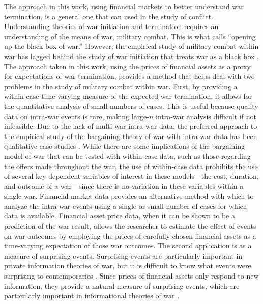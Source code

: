 The approach in this work, using financial markets to better understand war termination, is a general one that can used in the study of conflict.
Understanding theories of war initiation and termination requires an understanding of the means of war, military combat.
This is what \textcite{Gartner1998} calls ``opening up the black box of war.''
However, the empirical study of military combat within war has lagged behind the study of war initiation that treats war as a black box \parencite{Reiter2003}.
The approach taken in this work, using the prices of financial assets as a proxy for expectations of war termination, provides a method that helps deal with two problems in the study of military combat within war.
First, by providing a within-case time-varying measure of the expected war termination, it allows for the quantitative analysis of small numbers of cases.
This is useful because quality data on intra-war events is rare, making large-$n$ intra-war analysis difficult if not infeasible.
Due to the lack of multi-war intra-war data, the preferred approach to the empirical study of the bargaining theory of war with intra-war data has been qualitative case studies \parencites{Reiter2003}[][Chapter 9]{Reiter2009}. 
While there are some implications of the bargaining model of war that can be tested with within-case data, such as those regarding the offers made throughout the war, the use of within-case data prohibits the use of several key dependent variables of interest in these models---the cost, duration, and outcome of a war---since there is no variation in these variables within a single war.
Financial market data provides an alternative method with which to analyze the intra-war events using a single or small number of cases for which data is available.
Financial asset price data, when it can be shown to be a prediction of the war result, allows the researcher to estimate the effect of events on war outcomes by employing the prices of carefully chosen financial assets as a time-varying expectation of those war outcomes.
The second application is as a measure of surprising events.
Surprising events are particularly important in private information theories of war, but it is difficult to know what events were surprising to contemporaries \parencite{Shirkey2009a}.
Since prices of financial assets only respond to new information, they provide a natural measure of surprising events, which are particularly important in informational theories of war \parencite{Shirkey2009a}.

